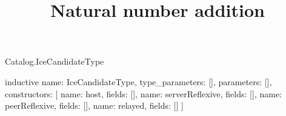 \begin{lexlean}{Catalog.IceCandidateType}
\title{Natural number addition}
\begin{semanticmodule}
inductive{
  name: IceCandidateType,
  type_parameters: [],
  parameters: [],
  constructors: [
    {name: host, fields: []},
    {name: serverReflexive, fields: []},
    {name: peerReflexive, fields: []},
    {name: relayed, fields: []}
  ]
}
\end{semanticmodule}
\end{lexlean}
